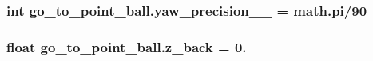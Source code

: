 \subsubsection[{\texorpdfstring{yaw\+\_\+precision\+\_\+2\+\_\+}{yaw_precision_2_}}]{\setlength{\rightskip}{0pt plus 5cm}int go\+\_\+to\+\_\+point\+\_\+ball.\+yaw\+\_\+precision\+\_\+\_\+ = math.\+pi/90}\hypertarget{namespacego__to__point__ball_a1985c69cf8534ba0bd2c6080f788a992}{}\label{namespacego__to__point__ball_a1985c69cf8534ba0bd2c6080f788a992}
\subsubsection[{\texorpdfstring{z\+\_\+back}{z_back}}]{\setlength{\rightskip}{0pt plus 5cm}float go\+\_\+to\+\_\+point\+\_\+ball.\+z\+\_\+back = 0.}\hypertarget{namespacego__to__point__ball_a176944c73499ce72fa754c7e1a6d138d}{}\label{namespacego__to__point__ball_a176944c73499ce72fa754c7e1a6d138d}
